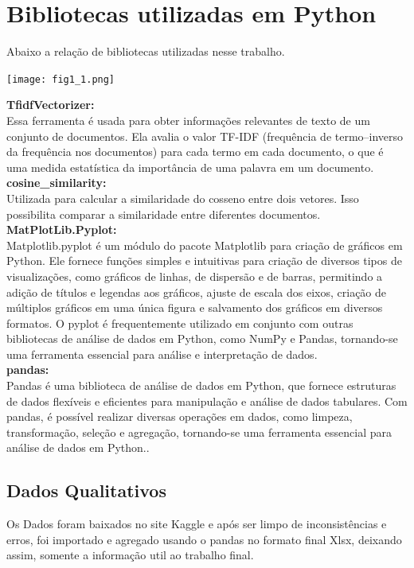 \documentclass[12pt, a4paper]{article}
\begin{document}
\section{Bibliotecas utilizadas em Python}
Abaixo a relação de bibliotecas utilizadas nesse trabalho.
\begin{center}
    \texttt{[image: fig1\_1.png]}
\end{center}

\textbf{TfidfVectorizer:}\\
Essa ferramenta é usada para obter informações relevantes de texto de um conjunto de documentos. Ela avalia o valor TF-IDF (frequência de termo–inverso da frequência nos documentos) para cada termo em cada documento, o que é uma medida estatística da importância de uma palavra em um documento.\\

\textbf{cosine\_similarity:}\\
\text{}Utilizada para calcular a similaridade do cosseno entre dois vetores. Isso possibilita comparar a similaridade entre diferentes documentos.\\

\textbf{MatPlotLib.Pyplot:}\\
Matplotlib.pyplot é um módulo do pacote Matplotlib para criação de gráficos em Python. Ele fornece funções simples e intuitivas para criação de diversos tipos de visualizações, como gráficos de linhas, de dispersão e de barras, permitindo a adição de títulos e legendas aos gráficos, ajuste de escala dos eixos, criação de múltiplos gráficos em uma única figura e salvamento dos gráficos em diversos formatos. O pyplot é frequentemente utilizado em conjunto com outras bibliotecas de análise de dados em Python, como NumPy e Pandas, tornando-se uma ferramenta essencial para análise e interpretação de dados.\\

\textbf{pandas:}\\
Pandas é uma biblioteca de análise de dados em Python, que fornece estruturas de dados flexíveis e eficientes para manipulação e análise de dados tabulares. Com pandas, é possível realizar diversas operações em dados, como limpeza, transformação, seleção e agregação, tornando-se uma ferramenta essencial para análise de dados em Python..

\subsection{Dados Qualitativos}
Os Dados foram baixados no site Kaggle e após ser limpo de inconsistências e erros, foi importado e agregado usando o pandas no formato final Xlsx, deixando assim, somente a informação util ao trabalho final.
\end{document}
